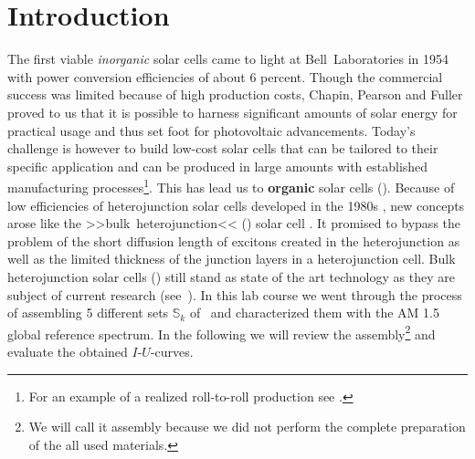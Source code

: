 
\section*{Introduction}%

The first viable \textit{inorganic} solar cells came to light at Bell~Laboratories in 1954 \cite{siliconSC_1}\cite{siliconSC_2} with power conversion efficiencies of about 6 percent. Though the commercial success was limited because of high production costs, Chapin, Pearson and Fuller proved to us that it is possible to harness significant amounts of solar energy for practical usage and thus set foot for photovoltaic advancements.\mypar
Today's challenge is however to build low-cost solar cells that can be tailored to their specific application and can be produced in large amounts with established manufacturing processes\footnote{For an example of a realized roll-to-roll production see \cite{rolltoroll}.}. This has lead us to \textbf{organic} solar cells (\OSC).\mypar
Because of low efficiencies of heterojunction solar cells developed in the 1980s \cite{tang}, new concepts arose like the >>bulk~heterojunction<< (\BHJ) solar cell \cite{heterojunk}. It promised to bypass the problem of the short diffusion length of excitons created in the heterojunction as well as the limited thickness of the junction layers in a heterojunction cell.\mypar
Bulk heterojunction solar cells (\BHSC) still stand as state of the art technology as they are subject of current research (see~\cite{modernbulkhetero}). In this lab course we went through the process of assembling 5 different sets $\mathbb{S}_k$ of \BHSC\ and characterized them with the {\os\sefo AM 1.5} global reference spectrum. In the following we will review the assembly\footnote{We will call it assembly because we did not perform the complete preparation of the all used materials.} and evaluate the obtained $I$-$U$-curves.

